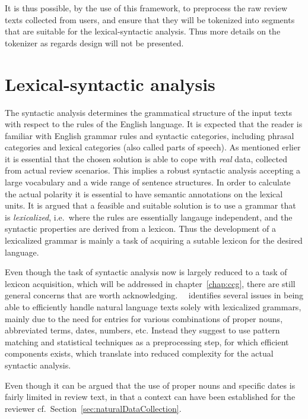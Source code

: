 It is thus possible, by the use of this framework, to preprocess the raw review texts collected from users, and ensure that they will be tokenized into segments that are suitable for the lexical-syntactic analysis. Thus more details on the tokenizer as regards design will not be presented.

\section{Lexical-syntactic analysis}
\label{sec:syntacticAnalysis}
The syntactic analysis determines the grammatical structure of the input texts with respect to the rules of the English language. It is expected that the reader is familiar with English grammar rules and syntactic categories, including phrasal categories and lexical categories (also called parts of speech). As mentioned erlier it is essential that the chosen solution is able to cope with \emph{real} data, collected from actual review scenarios. This implies a robust syntactic analysis accepting a large vocabulary and a wide range of sentence structures. In order to calculate the actual polarity it is essential to have semantic annotations on the lexical units. It is argued that a feasible and suitable solution is to use a grammar that is \emph{lexicalized}, i.e.\ where the rules are essentially langauge independent, and the syntactic properties are derived from a lexicon. Thus the development of a lexicalized grammar is mainly a task of acquiring a sutable lexicon for the desired language.

Even though the task of syntactic analysis now is largely reduced to a task of lexicon acquisition, which will be addressed in chapter~\ref{chap:ccg}, there are still general concerns that are worth acknowledging. \citeauthor{extendingCCG}~\ identifies several issues in being able to efficiently handle natural language texts solely with lexicalized grammars, mainly due to the need for entries for various combinations of proper nouns, abbreviated terms, dates, numbers, etc. Instead they suggest to use pattern matching and statistical techniques as a preprocessing step, for which efficient components exists, which translate into reduced complexity for the actual syntactic analysis.

Even though it can be argued that the use of proper nouns and specific dates is fairly limited in review text, in that a context can have been established for the reviewer cf.\ Section~\ref{sec:naturalDataCollection}. %


